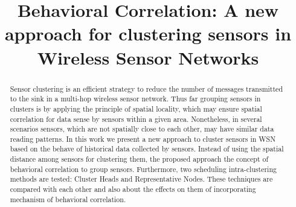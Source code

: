 \documentclass[conference]{IEEEtran}
\begin{document}
%

\title{Behavioral Correlation: A new approach for clustering sensors in Wireless Sensor Networks}

\author{
\and
{}
\and
{}
}


\maketitle


\begin{abstract}

Sensor clustering is an efficient strategy to reduce the number of messages
transmitted to the sink in a multi-hop wireless sensor network. Thus far
grouping sensors in clusters is by applying the principle of spatial locality,
which may ensure spatial correlation for data sense by sensors within a given
area. Nonetheless, in several scenarios sensors, which are not spatially close
to each other, may have similar data reading patterns.
In this work we present a new approach to cluster sensors in WSN based on the
behave of historical data collected by sensors. Instead of using the spatial
distance among sensors for clustering them, the proposed approach the concept of
behavioral correlation to group sensors.
Furthermore, two scheduling intra-clustering methods are tested: Cluster Heads
and Representative Nodes. These techniques are compared with each other and also
about the effects on them of incorporating mechanism of behavioral correlation.
\end{abstract}

\end{document}
